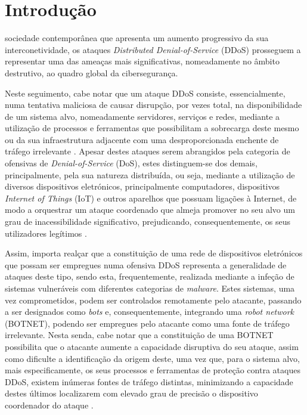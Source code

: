 \section{Introdução}
 sociedade contemporânea que apresenta um aumento progressivo da sua interconetividade, os ataques \textit{Distributed Denial-of-Service} (DDoS) prosseguem a representar uma das ameaças mais significativas, nomeadamente no âmbito destrutivo, ao quadro global da cibersegurança.

Neste seguimento, cabe notar que um ataque DDoS consiste, essencialmente, numa tentativa maliciosa
de causar disrupção, por vezes total, na disponibilidade de um sistema alvo, nomeadamente servidores, serviços e redes, mediante a utilização de processos e ferramentas que possibilitam a sobrecarga deste mesmo ou da sua infraestrutura adjacente com uma desproporcionada enchente de tráfego irrelevante \cite{cloudflare_what_is_ddos,ibm_what_is_ddos}. Apesar destes ataques serem abrangidos pela categoria de ofensivas de \textit{Denial-of-Service} (DoS), estes distinguem-se dos demais, principalmente, pela sua natureza distribuída, ou seja, mediante a utilização de diversos dispositivos eletrónicos, principalmente computadores, dispositivos \textit{Internet of Things} (IoT) e outros aparelhos que possuam ligações à Internet, de modo a orquestrar um ataque coordenado que almeja promover no seu alvo um grau de inacessibilidade significativo, prejudicando, consequentemente, os seus utilizadores legítimos \cite{zenamor_differences_dos_and_ddos}.

Assim, importa realçar que a constituição de uma rede de dispositivos eletrónicos que possam ser empregues numa ofensiva DDoS representa a generalidade de ataques deste tipo, sendo esta, frequentemente, realizada mediante a infeção de sistemas vulneráveis com diferentes categorias de \textit{malware}. Estes sistemas, uma vez comprometidos, podem ser controlados remotamente pelo atacante, passando a ser designados como \textit{bots} e, consequentemente, integrando uma \textit{robot network} (BOTNET), podendo ser empregues pelo atacante como uma fonte de tráfego irrelevante. Nesta senda, cabe notar que a constituição de uma BOTNET possibilita que o atacante aumente a capacidade disruptiva do seu ataque, assim como dificulte a identificação da origem deste, uma vez que, para o sistema alvo, mais especificamente, os seus processos e ferramentas de proteção contra ataques DDoS, existem inúmeras fontes de tráfego distintas, minimizando a capacidade destes últimos localizarem com elevado grau de precisão o dispositivo coordenador do ataque \cite{cloudflare_what_is_ddos}.

